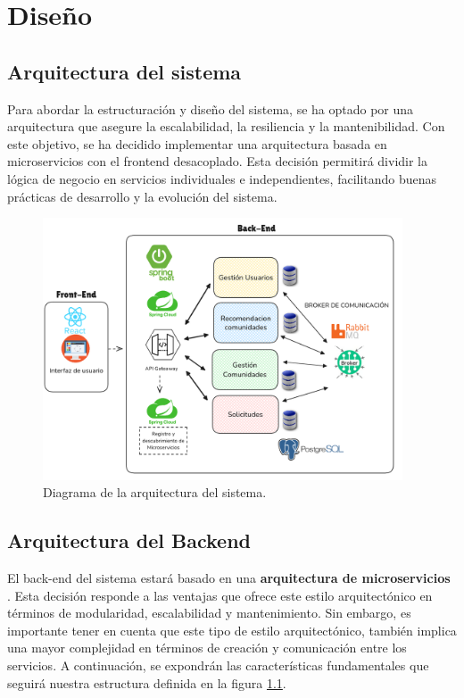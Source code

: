 \chapter{Diseño} \label{diseño}

\section{Arquitectura del sistema}
Para abordar la estructuración y diseño del sistema, se ha optado por una arquitectura que asegure la escalabilidad, la resiliencia y la mantenibilidad. Con este objetivo, se ha decidido implementar una arquitectura basada en microservicios con el frontend desacoplado. Esta decisión permitirá dividir la lógica de negocio en servicios individuales e independientes, facilitando buenas prácticas de desarrollo y  la evolución del sistema.

\begin{figure}[H]
    \centering
    \includegraphics[width=0.95\textwidth]{fotos/diagrama-sistema.png}
    \caption{Diagrama de la arquitectura del sistema.}
    \label{fig:arq}
\end{figure}
\section{Arquitectura del Backend}
El back-end del sistema estará basado en una \textbf{arquitectura de microservicios} \cite{richardsonMicroservices}. Esta decisión responde a las ventajas que ofrece este estilo arquitectónico  en términos de modularidad, escalabilidad y mantenimiento. Sin embargo, es importante tener en cuenta que este tipo de estilo arquitectónico, también implica una mayor complejidad en términos de creación y comunicación entre los servicios. A continuación, se expondrán las características fundamentales que seguirá nuestra estructura definida en la figura \ref{fig:arq}.

